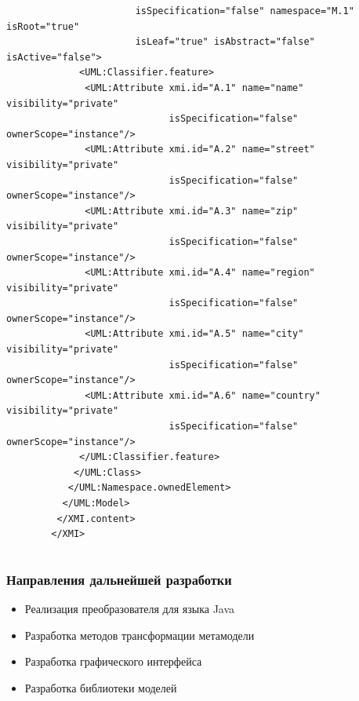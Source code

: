 \documentclass{beamer}
\begin{document}
\begin{frame}[fragile]
\begin{columns}
\begin{column}[c]{0.8\textwidth}
\begin{adjustbox}{width=0.8\textwidth,keepaspectratio}
\begin{lstlisting}
                       isSpecification="false" namespace="M.1" isRoot="true"
                       isLeaf="true" isAbstract="false" isActive="false">
             <UML:Classifier.feature>
              <UML:Attribute xmi.id="A.1" name="name" visibility="private"
                             isSpecification="false" ownerScope="instance"/>
              <UML:Attribute xmi.id="A.2" name="street" visibility="private"
                             isSpecification="false" ownerScope="instance"/>
              <UML:Attribute xmi.id="A.3" name="zip" visibility="private"
                             isSpecification="false" ownerScope="instance"/>
              <UML:Attribute xmi.id="A.4" name="region" visibility="private"
                             isSpecification="false" ownerScope="instance"/>
              <UML:Attribute xmi.id="A.5" name="city" visibility="private"
                             isSpecification="false" ownerScope="instance"/>
              <UML:Attribute xmi.id="A.6" name="country" visibility="private"
                             isSpecification="false" ownerScope="instance"/>
             </UML:Classifier.feature>
            </UML:Class>
           </UML:Namespace.ownedElement>
          </UML:Model>
         </XMI.content>
        </XMI>
        \end{lstlisting}
        \end{adjustbox}
    \end{column}
\end{columns}

\end{frame}
\begin{frame}
\frametitle{Направления дальнейшей разработки}

\begin{itemize}
    \item Реализация преобразователя для языка Java
    \item Разработка методов трансформации метамодели
    \item Разработка графического интерфейса
    \item Разработка библиотеки моделей
\end{itemize}

\end{frame}
\end{document}
